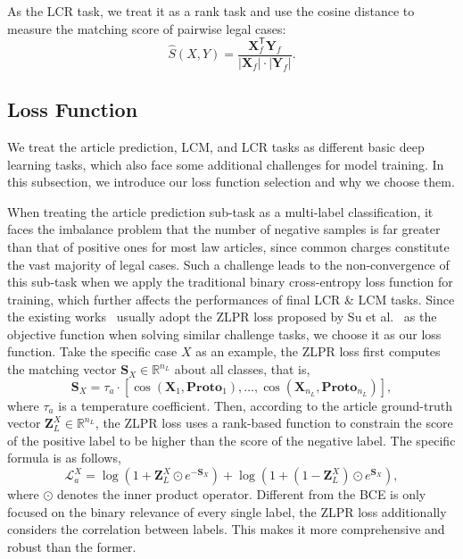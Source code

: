 As the LCR task, we treat it as a rank task and use the cosine distance to measure the matching score of pairwise legal cases:
\[ 
\hat{S}(X, Y) = \frac{\mathbf{X}_f^\mathsf{T} \mathbf{Y}_f}
{|\mathbf{X}_f| \cdot |\mathbf{Y}_f|}.
\]

\subsection{Loss Function}
We treat the article prediction, LCM, and LCR tasks as different basic deep learning tasks, which also face some additional challenges for model training.
In this subsection, we introduce our loss function selection and why we choose them.

When treating the article prediction sub-task as a multi-label classification, it faces the imbalance problem that the number of negative samples is far greater than that of positive ones for most law articles, since common charges constitute the vast majority of legal cases.
Such a challenge leads to the non-convergence of this sub-task when we apply the traditional binary cross-entropy loss function for training, which further affects the performances of final LCR \& LCM tasks.
Since the existing works~\cite{cai2024ner,tong2024legal, chen2024knowledge} usually adopt the ZLPR loss proposed by Su et al.~\cite{su2022ZLPR_loss} as the objective function when solving similar challenge tasks, we choose it as our loss function.
Take the specific case $X$ as an example, the ZLPR loss first computes the matching vector $\mathbf{S}_{X} \in \mathbb{R}^{n_L}$ about all classes, that is,
\[
\mathbf{S}_{X} = \tau_{a} \cdot \left[\cos(\mathbf{X}_1, \mathbf{Proto}_1), \ldots, \cos(\mathbf{X}_{n_L}, \mathbf{Proto}_{n_L})\right],
\]
where $\tau_{a}$ is a temperature coefficient. Then, according to the article ground-truth vector $\mathbf{Z}_{L}^{X} \in \mathbb{R}^{n_L}$, the ZLPR loss uses a rank-based function to constrain the score of the positive label to be higher than the score of the negative label. The specific formula is as follows,
\[
\mathscr{L}_{a}^{X} = \log\left(1 + \mathbf{Z}_{L}^{X} \odot e^{-\mathbf{S}_{X}}\right) + \log\left(1 + \left(1-\mathbf{Z}_{L}^{X}\right) \odot e^{\mathbf{S}_{X}}\right),
\]
where $\odot$ denotes the inner product operator.
Different from the BCE is only focused on the binary relevance of every single label, 
the ZLPR loss additionally considers the correlation between labels.
This makes it more comprehensive and robust than the former.


